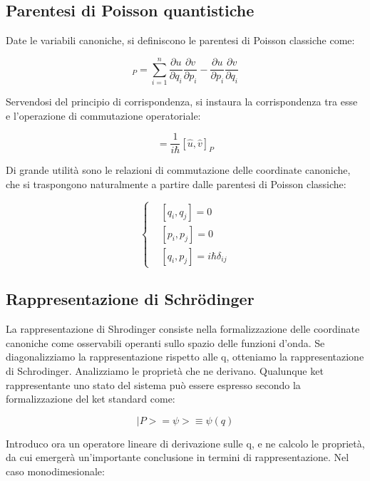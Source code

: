 \documentclass{article}
\begin{document}
\subsection{Parentesi di Poisson quantistiche}
Date le variabili canoniche, si definiscono le parentesi di Poisson classiche come:

\begin{equation}
    [u,v]_P = \sum_{i=1}^{n} \frac{\partial u}{\partial q_i}\frac{\partial v}{\partial p_i} - \frac{\partial u}{\partial p_i}\frac{\partial v}{\partial q_i}
\end{equation}

Servendosi del principio di corrispondenza, si instaura la corrispondenza tra esse e l'operazione di commutazione operatoriale:

\begin{equation}
     [\hat{u},\hat{v}]= \frac{1}{i\hbar}[\hat{u},\hat{v}]_P
\end{equation}

Di grande utilità sono le relazioni di commutazione delle coordinate canoniche, che si traspongono naturalmente a partire
dalle parentesi di Poisson classiche:

\begin{equation}
    \left\{
    \begin{aligned}
        & [q_i, q_j]=0 \\
        & [p_i, p_j]=0 \\
        & [q_i, p_j]=i\hbar \delta_{ij}
    \end{aligned}
    \right.
\end{equation}

\subsection{Rappresentazione di Schrödinger}
La rappresentazione di Shrodinger consiste nella formalizzazione delle coordinate canoniche come osservabili operanti sullo spazio delle funzioni d'onda.
Se diagonalizziamo la rappresentazione rispetto alle q, otteniamo la rappresentazione di Schrodinger.
Analizziamo le proprietà che ne derivano.
Qualunque ket rappresentante uno stato del sistema può essere espresso secondo la formalizzazione del ket standard come:

\begin{equation}
    |P>= \psi>\equiv \psi(q)
\end{equation}

Introduco ora un operatore lineare di derivazione sulle q, e ne calcolo le proprietà, da cui emergerà un'importante conclusione in termini di rappresentazione.
Nel caso monodimesionale:
\end{document}
